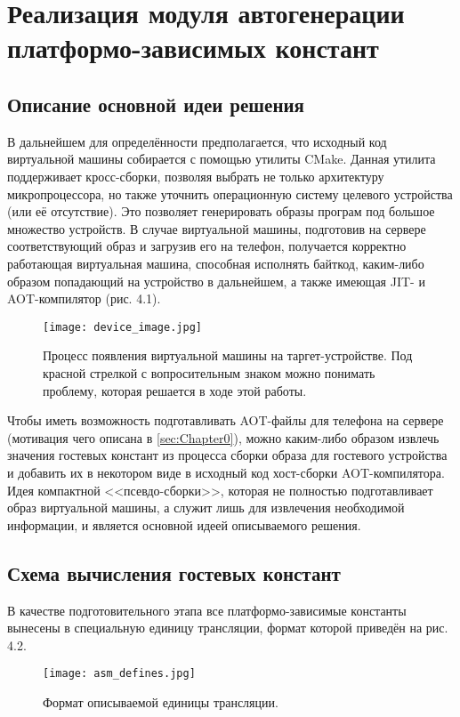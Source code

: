\chapter{Реализация модуля автогенерации платформо-зависимых констант}
\label{sec:Chapter3} 

\section{Описание основной идеи решения}
В дальнейшем для определённости предполагается, что исходный код виртуальной машины собирается с помощью утилиты CMake.
Данная утилита поддерживает кросс-сборки, позволяя выбрать не только архитектуру микропроцессора, но также уточнить операционную систему целевого устройства (или её отсутствие).
Это позволяет генерировать образы програм под большое множество устройств.
В случае виртуальной машины, подготовив на сервере соответствующий образ и загрузив его на телефон, получается корректно работающая виртуальная машина, способная исполнять байткод, каким-либо образом попадающий на устройство в дальнейшем, а также имеющая JIT- и AOT-компилятор (рис. 4.1).

\begin{figure}[H]
    \centering
    \texttt{[image: device\_image.jpg]}
    \caption{Процесс появления виртуальной машины на таргет-устройстве. Под красной стрелкой с вопросительным знаком можно понимать проблему, которая решается в ходе этой работы.}
\end{figure}

Чтобы иметь возможность подготавливать AOT-файлы для телефона на сервере (мотивация чего описана в \ref{sec:Chapter0}), можно каким-либо образом извлечь значения гостевых констант из процесса сборки образа для гостевого устройства и добавить их в некотором виде в исходный код хост-сборки AOT-компилятора.
Идея компактной <<псевдо-сборки>>, которая не полностью подготавливает образ виртуальной машины, а служит лишь для извлечения необходимой информации, и является основной идеей описываемого решения.

\section{Схема вычисления гостевых констант}
В качестве подготовительного этапа все платформо-зависимые константы вынесены в специальную единицу трансляции, формат которой приведён на рис. 4.2.

\begin{figure}[H]
    \centering
    \texttt{[image: asm\_defines.jpg]}
    \caption{Формат описываемой единицы трансляции.}
\end{figure}

